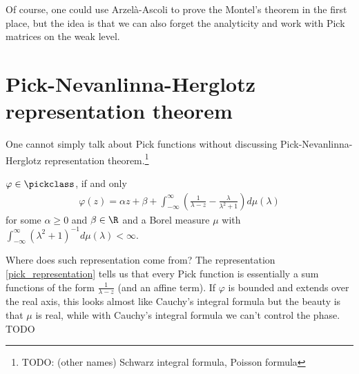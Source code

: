 Of course, one could use Arzel\`{a}-Ascoli to prove the Montel's theorem in the first place, but the idea is that we can also forget the analyticity and work with Pick matrices on the weak level.

\section{Pick-Nevanlinna-Herglotz representation theorem}

One cannot simply talk about Pick functions without discussing Pick-Nevanlinna-Herglotz representation theorem.\footnote{TODO: (other names) Schwarz integral formula, Poisson formula}

\begin{lause}\label{pick_nevanlinna_herglotz_representation_theorem}
	$\varphi \in \pickclass$, if and only
	\begin{align}\label{pick_representation}
		\varphi(z) = \alpha z + \beta + \int_{-\infty}^{\infty} \left(\frac{1}{\lambda - z} - \frac{\lambda}{\lambda^2 + 1}\right) d \mu(\lambda)
	\end{align}
	for some $\alpha \geq 0$ and $\beta \in \R$ and a Borel measure $\mu$ with $\int_{-\infty}^{\infty} (\lambda^2 + 1)^{-1} d \mu(\lambda) < \infty$.
\end{lause}

Where does such representation come from? The representation \ref{pick_representation} tells us that every Pick function is essentially a sum functions of the form $\frac{1}{\lambda - z}$ (and an affine term). If $\varphi$ is bounded and extends over the real axis, this looks almost like Cauchy's integral formula but the beauty is that $\mu$ is real, while with Cauchy's integral formula we can't control the phase. TODO

\begin{comment}
We have however almost discussed such identities already. We for instance observed that
\begin{align*}
	& \frac{1}{2 \pi}\int_{-\infty}^{\infty} \frac{\Im\left(\varphi(z)\right)}{(z - a) (z - \overline{a})} dz \\
	=& \Re\left(\frac{1}{2 \pi i}\int_{-\infty}^{\infty} \frac{\varphi(z)}{(z - a) (z - \overline{a})} dz\right) \\
	=& \frac{\varphi(a) - \overline{\varphi(a)}}{a - \overline{a}} \\
	=& \Im\left(\frac{\varphi(a)}{a}\right)
\end{align*}
\end{comment}

